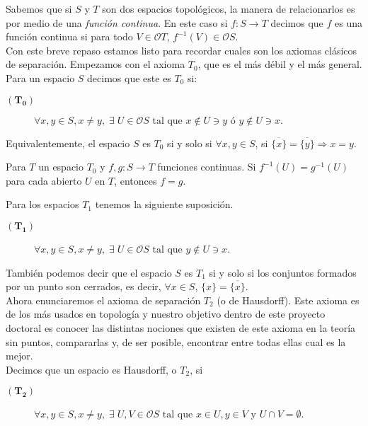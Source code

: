 Sabemos que si $S$ y $T$ son dos espacios topológicos, la manera de relacionarlos es por medio de una \textit{función continua}. En este caso si $f\colon S\to T$ decimos que $f$ es una función continua si para todo $V\in \mathcal{O}T$, $f^{-1}(V)\in \mathcal{O}S$.\\

Con este breve repaso estamos listo para recordar cuales son los axiomas clásicos de separación. Empezamos con el axioma \textbf{$T_0$}, que es el más débil y el más general.\\ 

Para un espacio $S$ decimos que este es $T_0$ si:

\begin{description}
\item[$(\mathbf{T_0})$] $\forall x, y\in S, x\neq y,\; \exists\; U\in \mathcal{O}S \mbox{ tal que } x\notin U \ni y \mbox{ ó } y\notin U \ni x.$
\end{description}

Equivalentemente, el espacio $S$ es $T_0$ si y solo si $\forall x,y\in S$, si $\overline{\{x\}}=\overline{\{y\}}\Rightarrow x=y$.

\begin{obs}
Para $T$ un espacio $T_0$ y $f,g\colon S\to T$ funciones continuas. Si $f^{-1}(U)=g^{-1}(U)$ para cada abierto $U$ en $T$, entonces $f=g$.
\end{obs}

Para los espacios $T_1$ tenemos la siguiente suposición. 

\begin{description}
\item[$(\mathbf{T_1})$] $\forall x, y\in S, x\neq y,\; \exists\; U\in \mathcal{O}S \mbox{ tal que } y\notin U \ni x$.
\end{description}

También podemos decir que el espacio $S$ es $T_1$ si y solo si los conjuntos formados por un punto son cerrados, es decir, $\forall x\in S$, $\{x\}=\overline{\{x\}}$.\\

Ahora enunciaremos el axioma de separación $T_2$ (o de Hausdorff). Este axioma es de los más usados en topología y nuestro objetivo dentro de este proyecto doctoral es conocer las distintas nociones que existen de este axioma en la teoría sin puntos, compararlas y, de ser posible, encontrar entre todas ellas cual es la mejor.\\

Decimos que un espacio es Hausdorff, o $T_2$, si
\begin{description}
\item[$(\mathbf{T_2})$] $\forall x, y\in S, x\neq y,\; \exists\; U, V\in \mathcal{O}S \mbox{ tal que } x\in U, y\in V \mbox{ y } U\cap V=\emptyset$.
\end{description}

